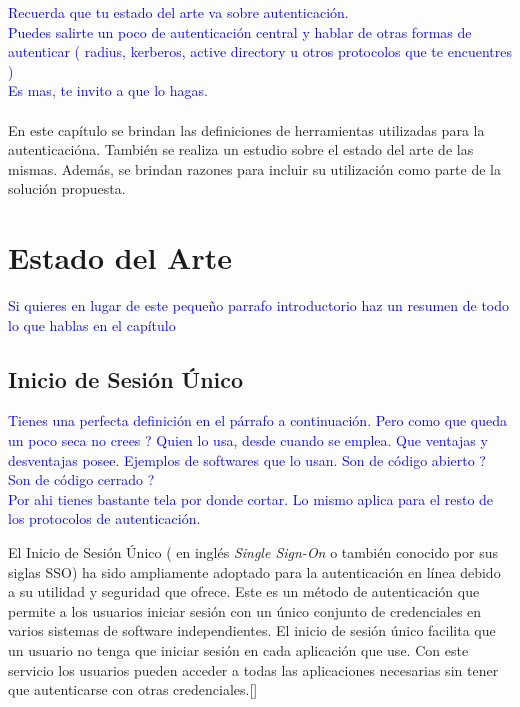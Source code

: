 \textcolor{blue}{Recuerda que tu estado del arte va sobre autenticación. \\
	Puedes salirte un poco de autenticación central y hablar de otras formas de autenticar ( radius, kerberos, active directory u otros protocolos que te encuentres )\\
	Es mas, te invito a que lo hagas.}\\\\
En este capítulo se brindan las definiciones de herramientas utilizadas para la autenticacióna. También se realiza un estudio sobre el estado del arte de las mismas. Además, se brindan razones para incluir su utilización como parte de la solución propuesta.

\chapter{Estado del Arte}\label{chapter:state-of-the-art}
\textcolor{blue}{Si quieres en lugar de este pequeño parrafo introductorio haz un resumen de todo lo que hablas en el capítulo }


\section{Inicio de Sesión Único}
\textcolor{blue}{Tienes una perfecta definición en el párrafo a continuación. Pero como que queda un poco seca no crees ? Quien lo usa, desde cuando se emplea. Que ventajas y desventajas posee. Ejemplos de softwares que lo usan. Son de código abierto ? Son de código cerrado ? \\
Por ahi tienes bastante tela por donde cortar. Lo mismo aplica para el resto de los protocolos de autenticación.}

El Inicio de Sesión Único ( en inglés \textit{Single Sign-On} o también conocido por sus siglas SSO) ha sido ampliamente adoptado para la autenticación en línea debido a su utilidad y seguridad que ofrece. Este es un método de autenticación que permite a los usuarios iniciar sesión con un único conjunto de credenciales en varios sistemas de software independientes. El inicio de sesión único facilita que un usuario no tenga que iniciar sesión en cada aplicación que use. Con este servicio los usuarios pueden acceder a todas las aplicaciones necesarias sin tener que autenticarse con otras credenciales.[\cite{microsoft-doc}]

